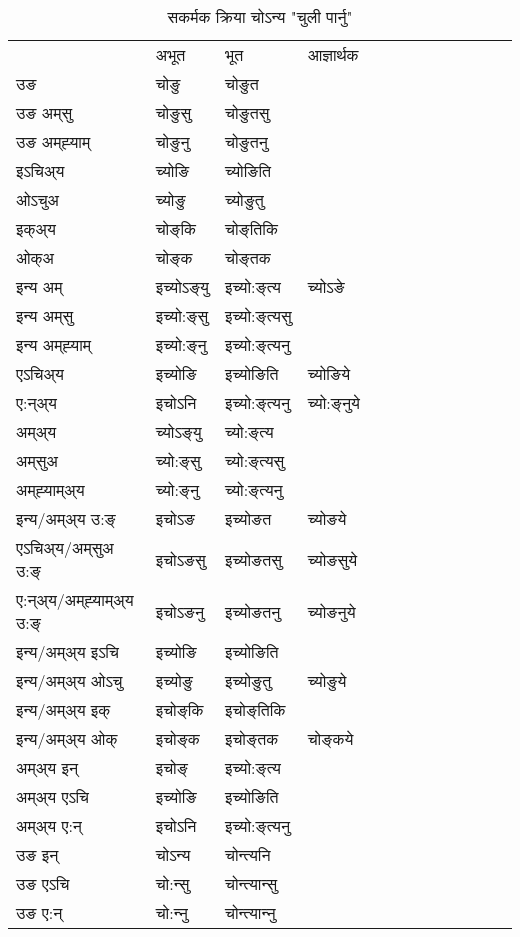 \begin{table}[H]
\centering
\caption{\label{oŋ.vt} सकर्मक क्रिया  चोऽन्य  "चुली पार्नु"  }
\begin{tabular}{l|l|l|l|l|l|l|l|l|l|l|l|l}  \toprule
&अभूत & भूत & आज्ञार्थक \\ 
उङ &चोङु &चोङुत \\ 
उङ अम्‌सु &चोङुसु &चोङुतसु \\ 
उङ अम्‌ह्‍याम् &चोङुनु &चोङुतनु \\ 
इऽचिअ्य &च्योङि &च्योङिति   \\ 
ओऽचुअ &च्योङु &च्योङुतु   \\ 
इक्अ्य &चोङ्‌कि &चोङ्‌तिकि   \\ 
ओक्अ &चोङ्‌क &चोङ्‌तक   \\ 
इन्य अम् & इच्योऽङ्‌यु  & इच्यो:ङ्‌त्य &च्योऽङे  \\ 
इन्य अम्‌सु & इच्यो:ङ्‌सु  & इच्यो:ङ्‌त्यसु   \\ 
इन्य अम्‌ह्‍याम् & इच्यो:ङ्‌नु  & इच्यो:ङ्‌त्यनु   \\ 
एऽचिअ्य & इच्योङि & इच्योङिति &च्योङिये    \\ 
ए:न्अ्य & इचोऽनि  & इच्यो:ङ्‌त्यनु &च्यो:ङ्‌नुये  \\ 
अम्अ्य & च्योऽङ्‌यु  & च्यो:ङ्‌त्य  \\ 
अम्‌सुअ & च्यो:ङ्‌सु & च्यो:ङ्‌त्यसु  \\ 
अम्‌ह्‍याम्अ्य & च्यो:ङ्‌नु  & च्यो:ङ्‌त्यनु \\ 
\midrule
इन्य/अम्अ्य उ:ङ्‌&इचोऽङ & इच्योङत &च्योङये \\ 
एऽचिअ्य/अम्‌सुअ उ:ङ्‌ &इचोऽङसु & इच्योङतसु &च्योङसुये \\ 
ए:न्अ्य/अम्‌ह्‍याम्अ्य उ:ङ्‌ &इचोऽङनु & इच्योङतनु &च्योङनुये \\ 
इन्य/अम्अ्य इऽचि & इच्योङि & इच्योङिति    \\ 
इन्य/अम्अ्य ओऽचु & इच्योङु & इच्योङुतु  &च्योङुये  \\ 
इन्य/अम्अ्य इक् & इचोङ्‌कि & इचोङ्‌तिकि   \\ 
इन्य/अम्अ्य ओक् & इचोङ्‌क & इचोङ्‌तक  &चोङ्‌कये  \\ 
अम्अ्य इन् & इचोङ्‌ & इच्यो:ङ्‌त्य   \\ 
अम्अ्य एऽचि & इच्योङि & इच्योङिति    \\ 
अम्अ्य ए:न् & इचोऽनि  & इच्यो:ङ्‌त्यनु  \\ 
\midrule
उङ इन् & चोऽन्य  & चोन्त्यनि  \\ 
उङ एऽचि & चो:न्सु  & चोन्त्यान्सु   \\ 
उङ ए:न्& चो:न्‍नु  & चोन्त्यान्‍नु   \\ 
\bottomrule
\end{tabular}
\end{table}


